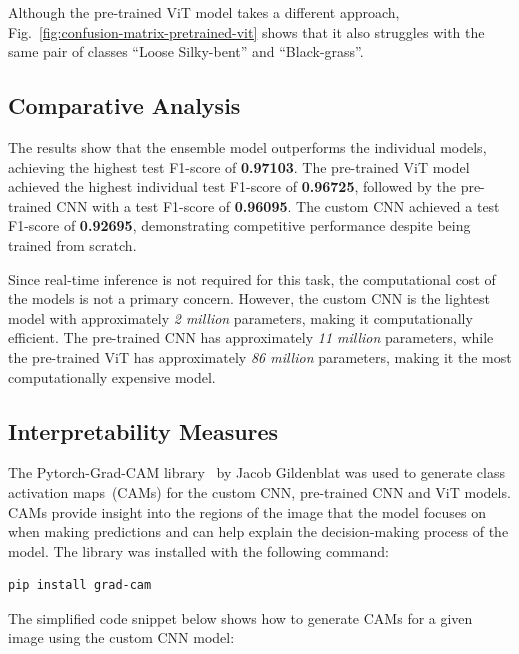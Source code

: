 Although the pre-trained ViT model takes a different approach, Fig.~\ref{fig:confusion-matrix-pretrained-vit} shows that it also struggles with the same pair of classes ``Loose Silky-bent'' and ``Black-grass''.

\subsection{Comparative Analysis}

The results show that the ensemble model outperforms the individual models, achieving the highest test F1-score of \textbf{0.97103}. The pre-trained ViT model achieved the highest individual test F1-score of \textbf{0.96725}, followed by the pre-trained CNN with a test F1-score of \textbf{0.96095}. The custom CNN achieved a test F1-score of \textbf{0.92695}, demonstrating competitive performance despite being trained from scratch.

Since real-time inference is not required for this task, the computational cost of the models is not a primary concern. However, the custom CNN is the lightest model with approximately \textit{2 million} parameters, making it computationally efficient. The pre-trained CNN has approximately \textit{11 million} parameters, while the pre-trained ViT has approximately \textit{86 million} parameters, making it the most computationally expensive model.

\subsection{Interpretability Measures}

The Pytorch-Grad-CAM library~\cite{jacobgilpytorchcam} by Jacob Gildenblat was used to generate class activation maps~(CAMs) for the custom CNN, pre-trained CNN and ViT models. CAMs provide insight into the regions of the image that the model focuses on when making predictions and can help explain the decision-making process of the model. The library was installed with the following command:

\begin{minipage}{0.9\linewidth}\begin{lstlisting}[language={},caption={Install Pytorch-Grad-CAM library.},label={lst:install-grad-cam}]
pip install grad-cam
\end{lstlisting}\end{minipage}

The simplified code snippet below shows how to generate CAMs for a given image using the custom CNN model:

